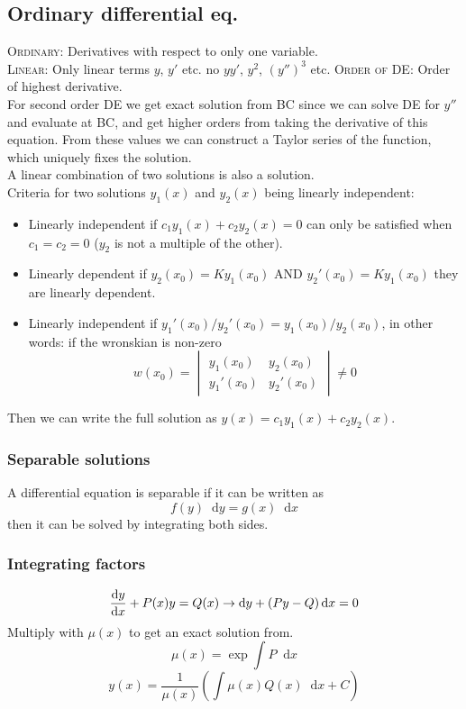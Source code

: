\documentclass[a4paper, 10pt]{article}
\newcommand*\diff{\mathop{}\!\mathrm{d}}
\begin{document}
\begin{multicols*}{3}
\begin{mdframed}
\subsection*{Ordinary differential eq.}
\end{mdframed}
\textsc{Ordinary:} Derivatives with respect to only one variable.\\
\textsc{Linear:} Only linear terms $y$, $y'$ etc. no $yy'$, $y^2$, $(y'')^3$ etc.
\textsc{Order of DE:} Order of highest derivative.\\
For second order DE we get exact solution from BC since we can solve DE for $y''$ and evaluate at BC, and get higher orders from taking the derivative of this equation. From these values we can construct a Taylor series of the function, which uniquely fixes the solution.\\
A linear combination of two solutions is also a solution.\\
Criteria for two solutions $y_1(x)$ and $y_2(x)$ being linearly independent:
\begin{itemize}
  \item Linearly independent if $c_1y_1(x) + c_2y_2(x) = 0$ can only be satisfied when $c_1 = c_2=0$ ($y_2$ is not a multiple of the other).
  \item Linearly dependent if $y_2(x_0) = Ky_1(x_0)$ AND $y_2'(x_0) = Ky_1(x_0)$ they are linearly dependent.
  \item Linearly independent if $y_1'(x_0)/y_2'(x_0) = y_1(x_0)/y_2(x_0)$, in other words: if the wronskian is non-zero $$ w(x_0) = \begin{vmatrix}
  y_1(x_0)  & y_2(x_0)\\
  y_1'(x_0) & y_2'(x_0)
  \end{vmatrix} \neq 0$$
\end{itemize}
Then we can write the full solution as $y(x)=c_1y_1(x) + c_2y_2(x)$.
\subsubsection*{\small Separable solutions}
A differential equation is separable if it can be written as $$f(y) \diff y = g(x) \diff x$$
then it can be solved by integrating both sides.

\subsubsection*{\small Integrating factors}
$$\dv{y}{x} + P(x)y = Q(x) \rightarrow \diff y + \left(Py-Q\right)\diff x = 0$$
Multiply with $\mu(x)$ to get an exact solution from.
$$ \mu(x) = \exp{\int P \diff x}$$
$$ y(x) = \frac{1}{\mu(x)}\left( \int \mu(x)Q(x)\diff x +C\right)$$

\end{multicols*}
\end{document}
